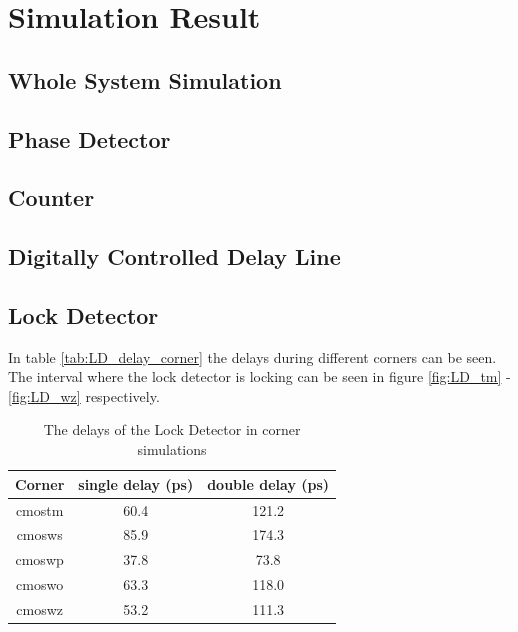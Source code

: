 \documentclass[a4paper,12pt]{article} \usepackage{graphicx}
\begin{document}
\section{Simulation Result}
\subsection{Whole System Simulation}
\subsection{Phase Detector}
\subsection{Counter}
\subsection{Digitally Controlled Delay Line}
\subsection{Lock Detector}
In table \ref{tab:LD_delay_corner} the delays during different corners
can be seen. The interval where the lock detector is locking can be
seen in figure \ref{fig:LD_tm} - \ref{fig:LD_wz} respectively. 
\begin{table}[h]
        \centering
        \begin{tabular}{|c|c|c|}
                \hline
                \textbf{Corner} & \textbf{single delay (ps)} &
                \textbf{double delay (ps)} \\
                \hline
                cmostm & 60.4 & 121.2 \\
                cmosws & 85.9 & 174.3 \\
                cmoswp & 37.8 & 73.8 \\
                cmoswo & 63.3 & 118.0 \\
                cmoswz & 53.2 & 111.3 \\
                \hline
        \end{tabular}
        \caption{The delays of the Lock Detector in corner simulations}
        \label{tab:LD_delays_corner}
\end{table}
\end{document}
